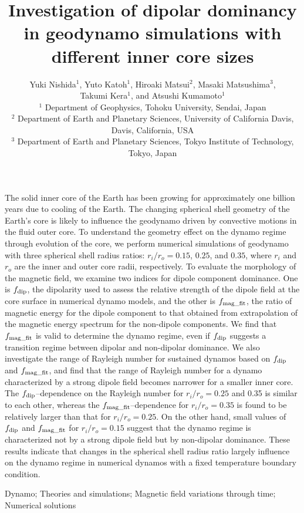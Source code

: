 \documentclass[mreferee]{gji}
\title[Dipolar dominancy in geodynamo with different inner core sizes]
{Investigation of dipolar dominancy in geodynamo simulations with different inner core sizes}
\author[Y. Nishida et al.]
{Yuki Nishida$^1$, Yuto Katoh$^1$, Hiroaki Matsui$^2$, Masaki Matsushima$^3$,\\ 
{\rm \LARGE
Takumi Kera$^1$, and Atsushi Kumamoto$^1$ }\\
  $^1$ Department of Geophysics, Tohoku University, Sendai, Japan \\
  $^2$ Department of Earth and Planetary Sciences, University of California Davis, Davis, California, USA \\
  $^3$ Department of Earth and Planetary Sciences, Tokyo Institute of Technology, Tokyo, Japan
  }
\date{ }
\begin{document}
\maketitle
%
\begin{summary}
The solid inner core of the Earth has been growing for approximately one billion years due to cooling of the Earth.
The changing spherical shell geometry of the Earth’s core is likely to influence the geodynamo driven by convective motions in the fluid outer core.
To understand the geometry effect on the dynamo regime through evolution of the core, we perform numerical simulations of geodynamo with three spherical shell radius ratios: $r_{i}/r_{o} = 0.15$, $0.25$, and $0.35$, where $r_{i}$ and $r_{o}$ are the inner and outer core radii, respectively.
To evaluate the morphology of the magnetic field, we examine two indices for dipole component dominance.
{\color{red}One is $f_{\rm dip}$, the dipolarity used to assess the relative strength of the dipole field at the core surface in numerical dynamo models, and the other is $f_{\rm mag\_fit}$, the ratio of magnetic energy for the dipole component to that obtained from extrapolation of the magnetic energy spectrum for the non-dipole components.}
{\color{red}We find that $f_{\rm mag\_fit}$ is valid to determine the dynamo regime, even if $f_{\rm dip}$ suggests a transition regime between dipolar and non-dipolar dominance.}
We also investigate the range of Rayleigh number for sustained dynamos based on $f_{\rm dip}$ and $f_{\rm mag\_fit}$, and find that the range of Rayleigh number for a dynamo characterized by a strong dipole field becomes narrower for a smaller inner core.
The $f_{\rm dip}$–dependence on the Rayleigh number for $r_{i}/r_{o} = 0.25$ and 0.35 is similar to each other, whereas the $f_{\rm mag\_fit}$–dependence for $r_{i}/r_{o} = 0.35$ is found to be relatively larger than that for $r_{i}/r_{o} = 0.25$. On the other hand, small values of  $f_{\rm dip}$ and  $f_{\rm mag\_fit}$ for $r_{i}/r_{o} = 0.15$ suggest that the dynamo regime is characterized not by a strong dipole field but by non-dipolar dominance.
These results indicate that changes in the spherical shell radius ratio largely influence on the dynamo regime in numerical dynamos with a fixed temperature boundary condition.
\end{summary}
%
\begin{keywords}
Dynamo; Theories and simulations; Magnetic field variations through time; Numerical solutions
\end{keywords}
%

%

%

%

%

%

%
\end{document}

